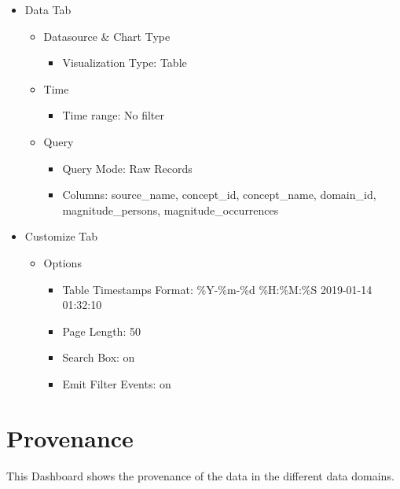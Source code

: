 \documentclass[
]{book}
\providecommand{\tightlist}{%
  \setlength{\itemsep}{0pt}\setlength{\parskip}{0pt}}
\begin{document}
\begin{itemize}
\tightlist
\item
  Data Tab

  \begin{itemize}
  \tightlist
  \item
    Datasource \& Chart Type

    \begin{itemize}
    \tightlist
    \item
      Visualization Type: Table
    \end{itemize}
  \item
    Time

    \begin{itemize}
    \tightlist
    \item
      Time range: No filter
    \end{itemize}
  \item
    Query

    \begin{itemize}
    \tightlist
    \item
      Query Mode: Raw Records
    \item
      Columns: source\_name, concept\_id, concept\_name, domain\_id, magnitude\_persons, magnitude\_occurrences
    \end{itemize}
  \end{itemize}
\item
  Customize Tab

  \begin{itemize}
  \tightlist
  \item
    Options

    \begin{itemize}
    \tightlist
    \item
      Table Timestamps Format: \%Y-\%m-\%d \%H:\%M:\%S \textbar{} 2019-01-14 01:32:10
    \item
      Page Length: 50
    \item
      Search Box: on
    \item
      Emit Filter Events: on
    \end{itemize}
  \end{itemize}
\end{itemize}

\hypertarget{provenance}{%
\chapter{Provenance}\label{provenance}}

This Dashboard shows the provenance of the data in the different data domains.
\end{document}
